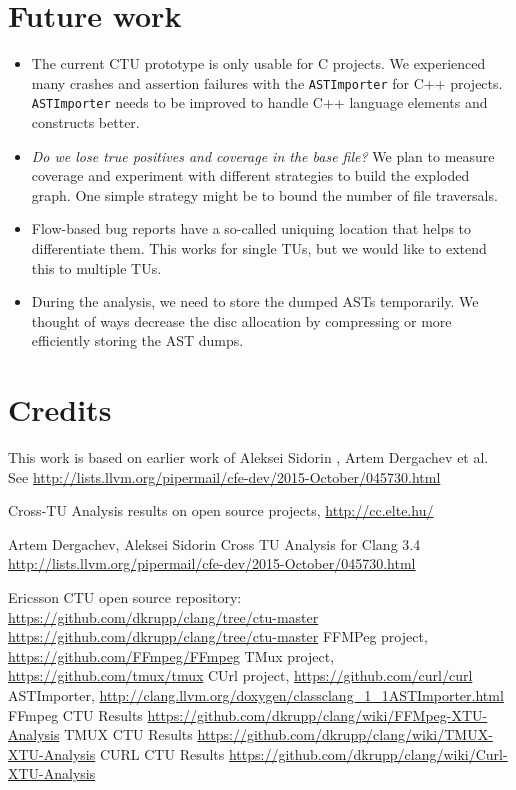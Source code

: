 \documentclass{article}
\begin{document}
\section{Future work}

\begin{itemize}
\item The current CTU prototype is only usable for C projects.
  We experienced many crashes and assertion failures with the
  \texttt{ASTImporter} for C++ projects.
  \texttt{ASTImporter} needs to be improved to handle C++ language elements
  and constructs better.
\item \emph{Do we lose true positives and coverage in the base file?}
We plan to measure coverage and experiment with different strategies
to build the exploded graph. One simple strategy might be to bound
the number of file traversals.
\item Flow-based bug reports have a so-called uniquing location that helps
to differentiate them. This works for single TUs, but we would like
to extend this to multiple TUs.
\item During the analysis, we need to store the dumped ASTs temporarily. 
We thought of ways decrease the disc allocation by compressing or 
more efficiently storing the AST dumps.
\end{itemize}

\section{Credits} %
This work is based on earlier work of Aleksei Sidorin , Artem Dergachev 
et al. See \url{http://lists.llvm.org/pipermail/cfe-dev/2015-October/045730.html}

\begin{thebibliography}{9}
 Cross-TU Analysis results on open source projects, \url{http://cc.elte.hu/}

 Artem Dergachev, Aleksei Sidorin Cross TU Analysis for Clang 
3.4 \url{http://lists.llvm.org/pipermail/cfe-dev/2015-October/045730.html}

 Ericsson CTU open source repository: \url{https://github.com/dkrupp/clang/tree/ctu-master}
 \url{https://github.com/dkrupp/clang/tree/ctu-master}
 FFMPeg project,  \url{https://github.com/FFmpeg/FFmpeg}
 TMux project, \url{https://github.com/tmux/tmux}
 CUrl project, \url{https://github.com/curl/curl}
 ASTImporter, \url{http://clang.llvm.org/doxygen/classclang_1_1ASTImporter.html}
 FFmpeg CTU Results {\small \url{https://github.com/dkrupp/clang/wiki/FFMpeg-XTU-Analysis}}
 TMUX CTU Results \url{https://github.com/dkrupp/clang/wiki/TMUX-XTU-Analysis}
 CURL CTU Results \url{https://github.com/dkrupp/clang/wiki/Curl-XTU-Analysis}
\end{thebibliography}
\end{document}
